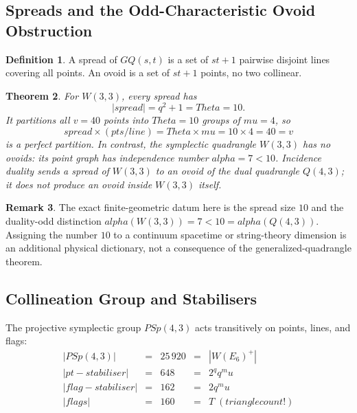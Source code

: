 \documentclass[12pt,a4paper]{article}
\def\mathrm#1{#1}%
\def\textbf#1{#1}%
\def\text#1{#1}%
\def\alpha{alpha}%
\def\mu{mu}%
\def\Theta{Theta}%
\def\cdot{ }%
\newtheorem{theorem}{Theorem}[section]
\theoremstyle{definition}
\newtheorem{definition}[theorem]{Definition}
\newtheorem{remark}[theorem]{Remark}
\newcommand{\GQ}{\mathrm{GQ}}
\newcommand{\PSp}{\mathrm{PSp}}
\begin{document}
\subsection{Spreads and the Odd-Characteristic Ovoid Obstruction}

\begin{definition}
A \textbf{spread} of $\GQ(s,t)$ is a set of $st+1$ pairwise
disjoint lines covering all points.
An \textbf{ovoid} is a set of $st+1$ points, no two collinear.
\end{definition}

\begin{theorem}
For $W(3,3)$, every spread has
\begin{equation}
|\text{spread}|=q^2+1=\Theta=10.
\end{equation}
It partitions all $v=40$ points into $\Theta=10$ groups of
$\mu=4$, so
\begin{equation}
\text{spread}\times(\text{pts/line}) = \Theta\times\mu = 10\times 4 = 40 = v
\end{equation}
is a perfect partition.  In contrast, the symplectic quadrangle
$W(3,3)$ has no ovoids: its point graph has independence number
$\alpha=7<10$.  Incidence duality sends a spread of $W(3,3)$ to an
ovoid of the dual quadrangle $Q(4,3)$; it does not produce an ovoid
inside $W(3,3)$ itself.
\end{theorem}

\begin{remark}
The exact finite-geometric datum here is the spread size $10$ and the
duality-odd distinction
$\alpha(W(3,3))=7<10=\alpha(Q(4,3))$.  Assigning the number $10$ to a
continuum spacetime or string-theory dimension is an additional physical
dictionary, not a consequence of the generalized-quadrangle theorem.
\end{remark}


\subsection{Collineation Group and Stabilisers}

The projective symplectic group $\PSp(4,3)$ acts transitively on
points, lines, and flags:
\begin{equation}
\renewcommand{\arraystretch}{1.3}
\begin{array}{rclcl}
|\PSp(4,3)| &=& 25\,920 &=& |W(E_6)^+| \\[3pt]
|\text{pt-stabiliser}| &=& 648 &=& 2^q\cdot q^\mu \\[3pt]
|\text{flag-stabiliser}| &=& 162 &=& 2\cdot q^\mu \\[3pt]
|\text{flags}| &=& 160 &=& T \;(\text{triangle count!})
\end{array}
\end{equation}
\end{document}
